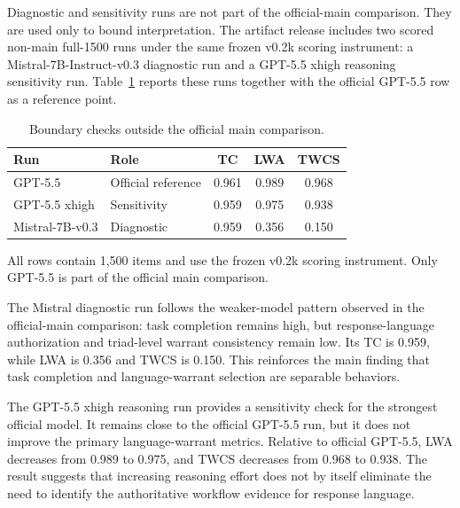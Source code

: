 \documentclass[10pt,conference]{IEEEtran}
\newcommand{\metric}[1]{\textsc{#1}}
\begin{document}
Diagnostic and sensitivity runs are not part of the official-main comparison. They are used only to bound interpretation. The artifact release includes two scored non-main full-1500 runs under the same frozen v0.2k scoring instrument: a Mistral-7B-Instruct-v0.3 diagnostic run and a GPT-5.5 xhigh reasoning sensitivity run. Table~\ref{tab:diagnostic-sensitivity-runs} reports these runs together with the official GPT-5.5 row as a reference point.


\begin{table}[t]
\centering
\caption{Boundary checks outside the official main comparison.}
\label{tab:diagnostic-sensitivity-runs}
\footnotesize
\setlength{\tabcolsep}{4.5pt}
\renewcommand{\arraystretch}{1.08}
\begin{tabularx}{\columnwidth}{@{}>{\raggedright\arraybackslash}p{}>{\raggedright\arraybackslash}p{}ccc@{}}
\toprule
\textbf{Run} & \textbf{Role} & \textbf{TC} & \textbf{LWA} & \textbf{TWCS} \tabularnewline
\midrule
GPT-5.5 & Official reference & 0.961 & 0.989 & 0.968 \tabularnewline
GPT-5.5 xhigh & Sensitivity & 0.959 & 0.975 & 0.938 \tabularnewline
Mistral-7B-v0.3 & Diagnostic & 0.959 & 0.356 & 0.150 \tabularnewline
\bottomrule
\end{tabularx}
\vspace{0.25em}
\begin{minipage}{0.98\columnwidth}
\footnotesize
All rows contain 1,500 items and use the frozen v0.2k scoring instrument. Only GPT-5.5 is part of the official main comparison.
\end{minipage}
\end{table}



The Mistral diagnostic run follows the weaker-model pattern observed in the official-main comparison: task completion remains high, but response-language authorization and triad-level warrant consistency remain low. Its \metric{TC} is 0.959, while \metric{LWA} is 0.356 and \metric{TWCS} is 0.150. This reinforces the main finding that task completion and language-warrant selection are separable behaviors.

The GPT-5.5 xhigh reasoning run provides a sensitivity check for the strongest official model. It remains close to the official GPT-5.5 run, but it does not improve the primary language-warrant metrics. Relative to official GPT-5.5, \metric{LWA} decreases from 0.989 to 0.975, and \metric{TWCS} decreases from 0.968 to 0.938. The result suggests that increasing reasoning effort does not by itself eliminate the need to identify the authoritative workflow evidence for response language.
\end{document}
